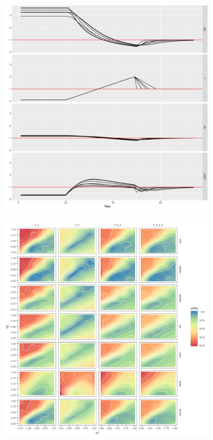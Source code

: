 \documentclass[preprint,12pt]{elsarticle}
\begin{document}
\begin{figure}[]\centering\includegraphics[width=5in]{rg-ts-1.png}\caption{}\label{fig:ts}\end{figure}
\begin{figure}[]\centering\includegraphics[width=5in]{util.png}\caption{}\label{fig:util}\end{figure}
\end{document}
